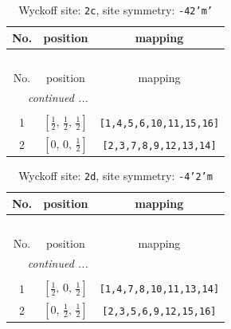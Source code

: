 \documentclass[fleqn,8pt]{jsarticle}
\begin{document}
\renewcommand{\arraystretch}{1.2}
\begin{longtable}{ccc}
\caption{Wyckoff site: {\tt 2c}, site symmetry: {\tt -42'm'}}
 \\
 \hline \hline
No. & position & mapping \\ \hline \endfirsthead

\multicolumn{2}{l}{\tablename\ \thetable{}} \\
 \hline \hline
No. & position & mapping \\ \hline \endhead

 \hline \hline
\multicolumn{2}{r}{\footnotesize\it continued ...} \\ \endfoot

 \hline \hline
\multicolumn{2}{r}{} \\ \endlastfoot

1 & $\left[ \frac{1}{2},\, \frac{1}{2},\, \frac{1}{2} \right]$ & {\tt [1,4,5,6,10,11,15,16]} \\ \hline
2 & $\left[ 0,\, 0,\, \frac{1}{2} \right]$ & {\tt [2,3,7,8,9,12,13,14]} \\
\end{longtable}
\renewcommand{\arraystretch}{1.2}
\begin{longtable}{ccc}
\caption{Wyckoff site: {\tt 2d}, site symmetry: {\tt -4'2'm}}
 \\
 \hline \hline
No. & position & mapping \\ \hline \endfirsthead

\multicolumn{2}{l}{\tablename\ \thetable{}} \\
 \hline \hline
No. & position & mapping \\ \hline \endhead

 \hline \hline
\multicolumn{2}{r}{\footnotesize\it continued ...} \\ \endfoot

 \hline \hline
\multicolumn{2}{r}{} \\ \endlastfoot

1 & $\left[ \frac{1}{2},\, 0,\, \frac{1}{2} \right]$ & {\tt [1,4,7,8,10,11,13,14]} \\ \hline
2 & $\left[ 0,\, \frac{1}{2},\, \frac{1}{2} \right]$ & {\tt [2,3,5,6,9,12,15,16]} \\
\end{longtable}
\renewcommand{\arraystretch}{1.2}
\end{document}
